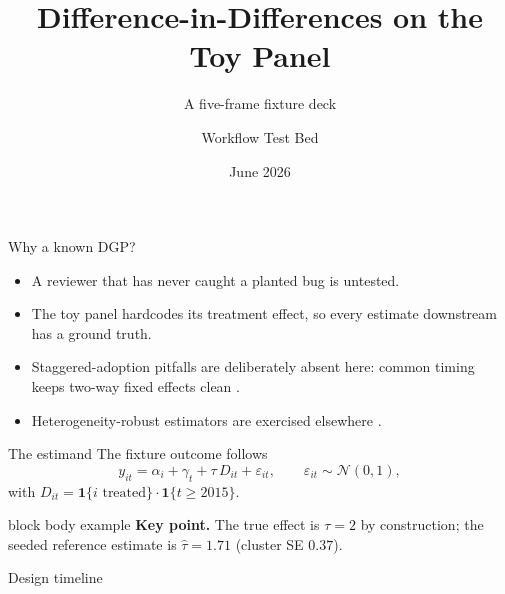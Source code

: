 \documentclass[11pt]{beamer}
\title{Difference-in-Differences on the Toy Panel}
\subtitle{A five-frame fixture deck}
\author{Workflow Test Bed}
\date{June 2026}
\newenvironment{keybox}%
  {\begin{beamercolorbox}[rounded=true, sep=6pt]{block body example}}%
  {\end{beamercolorbox}}
\begin{document}
\begin{frame}
  \titlepage
\end{frame}

\begin{frame}{Why a known DGP?}
  \begin{itemize}
    \item A reviewer that has never caught a planted bug is untested.
    \item The toy panel hardcodes its treatment effect, so every estimate downstream has a ground truth.
    \item Staggered-adoption pitfalls are deliberately absent here: common timing keeps two-way fixed effects clean \citep{goodmanbacon2021}.
    \item Heterogeneity-robust estimators are exercised elsewhere \citep{callaway2021}.
  \end{itemize}
\end{frame}

\begin{frame}{The estimand}
  The fixture outcome follows
  \begin{equation}
    y_{it} = \alpha_i + \gamma_t + \tau \, D_{it} + \varepsilon_{it},
    \qquad \varepsilon_{it} \sim \mathcal{N}(0, 1),
    \label{eq:dgp}
  \end{equation}
  with $D_{it} = \mathbf{1}\{i \text{ treated}\} \cdot \mathbf{1}\{t \ge 2015\}$.

  \begin{keybox}
    \textbf{Key point.} The true effect is $\tau = 2$ by construction; the
    seeded reference estimate is $\hat{\tau} = 1.71$ (cluster SE $0.37$).
  \end{keybox}
\end{frame}

\begin{frame}{Design timeline}
  \begin{center}
  \end{center}
\end{frame}
\end{document}
